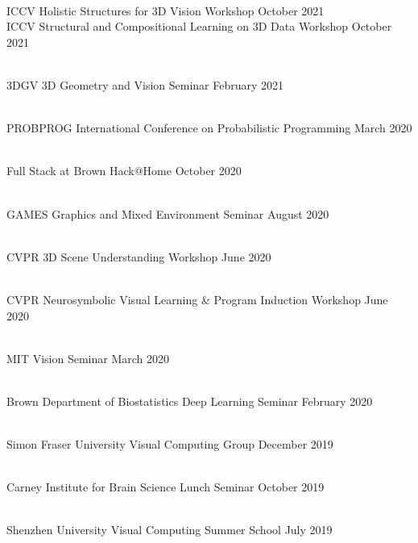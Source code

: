 \documentclass[line,margin]{res}
\begin{document}
\begin{resume}
\\
\talk
	{ICCV}
	{Holistic Structures for 3D Vision Workshop}
	{October 2021}
\\
\talk
	{ICCV}
	{Structural and Compositional Learning on 3D Data Workshop}
	{October 2021}

\\
\talk
	{3DGV}
	{3D Geometry and Vision Seminar}
	{February 2021}

\\
\talk
	{PROBPROG}
	{International Conference on Probabilistic Programming}
	{March 2020}

\\
\talk
	{Full Stack at Brown}
	{Hack@Home}
	{October 2020}

\\
\talk
	{GAMES}
	{Graphics and Mixed Environment Seminar}
	{August 2020}

\\
\talk
	{CVPR}
	{3D Scene Understanding Workshop}
	{June 2020}

\\
\talk
	{CVPR}
	{Neurosymbolic Visual Learning \& Program Induction Workshop}
	{June 2020}

\\
\talk
	{MIT}
	{Vision Seminar}
	{March 2020}

\\
\talk
	{Brown Department of Biostatistics}
	{Deep Learning Seminar}
	{February 2020}

\\
\talk
	{Simon Fraser University}
	{Visual Computing Group}
	{December 2019}

\\
\talk
	{Carney Institute for Brain Science}
	{Lunch Seminar}
	{October 2019}

\\
\talk
	{Shenzhen University}
	{Visual Computing Summer School}
	{July 2019}


\end{resume}
\end{document}
